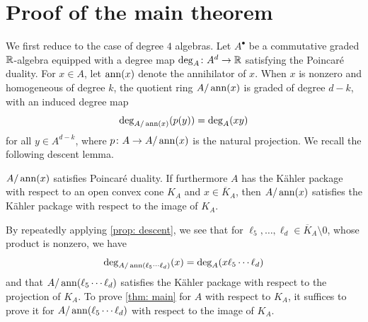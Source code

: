 \section{Proof of the main theorem} \label{sec: proof}
We first reduce to the case of degree $4$ algebras. Let $A^\bullet$ be a commutative graded $\mathbb{R}$-algebra equipped with a degree map $\deg_A\colon A^d\to\mathbb{R}$ satisfying the Poincaré duality.  For $x\in A$, let $\operatorname{ann}(x)$ denote the annihilator of $x$. When $x$ is nonzero and homogeneous of degree $k$, the quotient ring $A/\operatorname{ann}(x)$ is graded of degree $d-k$, with an induced degree map
\[
    \deg_{A/\operatorname{ann}(x)}(p(y))=\deg_A(xy)
\]
for all $y\in A^{d-k}$, where $p\colon A\to A/\operatorname{ann}(x)$ is the natural projection. We recall the following descent lemma.
\begin{proposition}\label{prop: descent}
    $A/\operatorname{ann}(x)$ satisfies Poincaré duality. If furthermore $A$ has the Kähler package with respect to an open convex cone $K_A$ and $x\in \overline K_A$, then $A/\operatorname{ann}(x)$ satisfies the Kähler package with respect to the image of $K_A$.
\end{proposition}

By repeatedly applying \cref{prop: descent}, we see that for $\ell_5,\ldots,\ell_d\in \overline{K}_A\setminus 0$, whose product is nonzero, we have
\[
    \deg_{A/\operatorname{ann}(\ell_5\cdots\ell_d)}(x)=\deg_{A}(x \ell_5\cdots\ell_d)
\]
and that $A/\operatorname{ann}(\ell_5\cdots\ell_d)$ satisfies the K\"ahler package with respect to the projection of $K_A$. To prove \cref{thm: main} for $A$ with respect to $K_A$, it suffices to prove it for $A/\operatorname{ann}(\ell_5\cdots\ell_d)$ with respect to the image of $K_A$.

